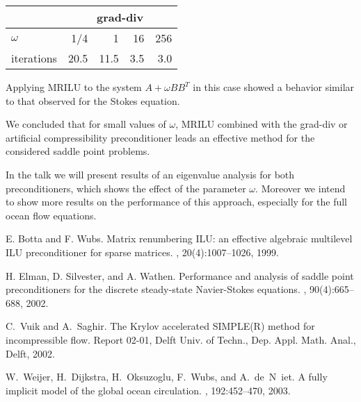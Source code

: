 \documentclass{report}
\begin{document}
\begin{center}
\begin{tabular}{l|rrrr|}
&\multicolumn{4}{|c}{\sc grad-div} \\
\hline
$\omega$ &1/4 &1 & 16 &256\\
iterations &20.5 &11.5 &3.5 &3.0\\
\hline
\end{tabular}
\end{center}
Applying {\sc MRILU} to the system $A+\omega BB^T$ in this case
showed a behavior similar to that observed for the Stokes
equation.

We concluded that for small values of $\omega$, MRILU combined
with the grad-div or artificial compressibility preconditioner
leads an effective method for the considered saddle point
problems.

In the talk we will present results of an eigenvalue analysis for
both preconditioners, which shows the effect of the parameter
$\omega$. Moreover we intend to show more results on the
performance of this approach, especially for the full ocean flow
equations.

\begin{thebibliography}{1}

E. Botta and F. Wubs.
\newblock Matrix renumbering {I}{L}{U}: an effective algebraic multilevel
{I}{L}{U} preconditioner for sparse matrices.
, 20(4):1007--1026,
1999.

H. Elman, D. Silvester, and A. Wathen.
\newblock Performance and analysis of saddle point preconditioners for the
discrete steady-state {N}avier-{S}tokes equations.
, 90(4):665--688, 2002.

C.~Vuik and A.~Saghir.
\newblock The {K}rylov accelerated {SIMPLE(R)} method for incompressible flow.
\newblock Report 02-01, Delft Univ. of Techn., Dep. Appl. Math. Anal., Delft, 2002.

W.~Weijer, H.~Dijkstra, H.~Oksuzoglu, F.~Wubs, and A.~de~N~iet.
\newblock A fully implicit model of the global ocean circulation.
, 192:452--470, 2003.

\end{thebibliography}
\end{document}
